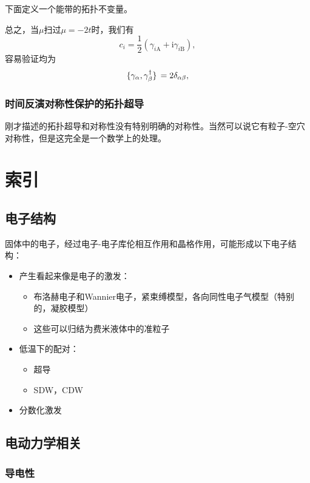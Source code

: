 \documentclass[hyperref, UTF8, a4paper]{ctexart}
\newcommand*{\ii}{\mathrm{i}}
\begin{document}
下面定义一个能带的拓扑不变量。

总之，当$\mu$扫过$\mu=-2t$时，我们有
\[
    {c}_i = \frac{1}{2} ({\gamma}_{i\text{A}} + \ii {\gamma}_{i \text{B}}),
\]
容易验证均为
\begin{equation}
    \acomm*{{\gamma}_\alpha}{{\gamma}_\beta^\dagger} = 2 \delta_{\alpha \beta},
\end{equation}

\subsubsection{时间反演对称性保护的拓扑超导}

刚才描述的拓扑超导和对称性没有特别明确的对称性。当然可以说它有粒子-空穴对称性，但是这完全是一个数学上的处理。

\section*{索引}

\subsection{电子结构}

固体中的电子，经过电子-电子库伦相互作用和晶格作用，可能形成以下电子结构：
\begin{itemize}
    \item 产生看起来像是电子的激发：
    \begin{itemize}
        \item 布洛赫电子和Wannier电子，紧束缚模型，各向同性电子气模型（特别的，凝胶模型）
        \item 这些可以归结为费米液体中的准粒子
    \end{itemize}
    \item 低温下的配对：
    \begin{itemize}
        \item 超导
        \item SDW，CDW
    \end{itemize}
    \item 分数化激发
\end{itemize}

\subsection{电动力学相关}

\subsubsection{导电性}
\end{document}
